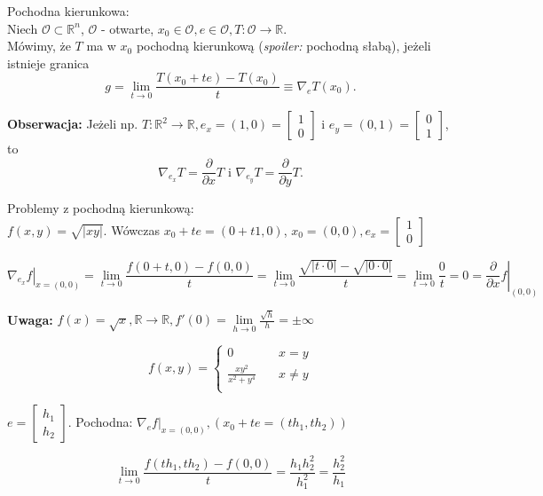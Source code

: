 \documentclass[../main.tex]{subfiles}
\begin{document}
\pagebreak
\begin{definicja}
    Pochodna kierunkowa:\\
    Niech $\mathcal{O}\subset\mathbb{R}^{n}$, $\mathcal{O}$ - otwarte, $x_0\in\mathcal{O},e\in\mathcal{O},T:\mathcal{O}\to\mathbb{R}$.\\
    Mówimy, że $T$ ma w $x_0$ pochodną kierunkową (\textit{spoiler:} pochodną słabą), jeżeli istnieje granica
    \[
        g = \lim\limits_{t \to 0}\frac{T(x_0 +te) - T(x_0)}{t} \equiv \nabla_e T(x_0)
    .\]
\end{definicja}

\textbf{Obserwacja:} Jeżeli np.
$T: \mathbb{R}^{2}\to\mathbb{R}, e_x=(1,0)= \begin{bmatrix} 1\\0 \end{bmatrix} $ i $e_y = (0,1) = \begin{bmatrix} 0\\1 \end{bmatrix} $, to
\[
    \nabla_{e_{x}} T = \frac{\partial}{\partial x} T \text{ i } \nabla_{e_{y}} T = \frac{\partial}{\partial y} T
.\]

\begin{przyklad}
    Problemy z pochodną kierunkową:\\

$f(x,y) = \sqrt{|xy|}$. Wówczas $x_0 + te = (0+t1,0)$, $x_0 = (0,0), e_x = \begin{bmatrix} 1\\0 \end{bmatrix} $

    \[
        \left. \nabla_{e_x} f \right|_{x=(0,0)} = \lim\limits_{t \to 0}\frac{f(0+t,0) - f(0,0)}{t} = \lim\limits_{t \to 0}\frac{\sqrt{|t \cdot  0|} - \sqrt{|0 \cdot 0|}}{t} = \lim\limits_{t \to 0}\frac{0}{t} = 0 = \left. \frac{\partial}{\partial x} f\right |_{(0,0)}
    \]

\textbf{Uwaga:} $f(x) = \sqrt{x}, \mathbb{R}\to\mathbb{R}, f'(0) = \lim\limits_{h \to 0}\frac{\sqrt{h}}{h} = \pm \infty$

\[
f(x,y) =
    \begin{cases}
        0 & \quad x=y\\
        \frac{xy^2}{x^2+y^4} & \quad x \neq y\\
    \end{cases}
\]

$e = \begin{bmatrix} h_1\\h_2 \end{bmatrix}$. Pochodna: $\left. \nabla_e f\right |_{x=(0,0)}, (x_0 + te = (th_1, th_2))$

$$\lim\limits_{t \to 0}\frac{f(th_1, th_2) - f(0,0)}{t} = \frac{h_1 h_2^2}{h_1^2} = \frac{h_2^2}{h_1}$$
\end{przyklad}
\end{document}

